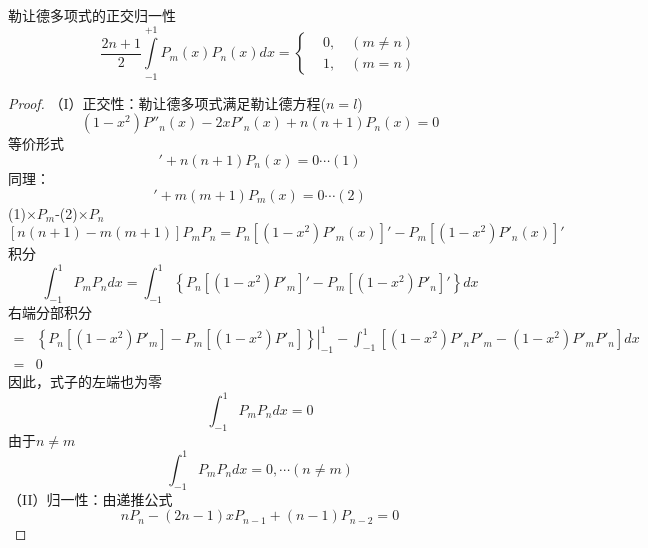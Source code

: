 	\begin{proposition}勒让德多项式的正交归一性
		\[ \frac{2n+1}{2} \int\limits_{-1}^{+1}  P_m(x) P_n(x)dx = \left\{ 
			\begin{aligned}
				& 0, \quad (m\ne n) \\ 
				& 1 , \quad (m= n)
			\end{aligned}\right.\]
		\end{proposition}
	\begin{proof}
		（I）正交性：勒让德多项式满足勒让德方程($n=l$)
		\begin{equation*}
			\left(1-x^{2}\right) P'' _n  (x) -2 x P' _n (x)+n(n+1)P_n(x)=0
		\end{equation*}		
		等价形式
		\begin{equation*}
			[\left(1-x^{2}\right) P' _n  (x)]' +n(n+1)P_n(x)=0    \cdots  (1)
		\end{equation*}		
		同理：
		\begin{equation*}
			[\left(1-x^{2}\right) P' _m  (x)]' + m (m+1)P_m(x)=0    \cdots  (2)
		\end{equation*}		
		(1)$\times P_m$-(2)$\times P_n$
		\[ [n(n+1) -m (m+1)] P_m P_n = P_n[\left(1-x^{2}\right) P' _m  (x)]' - P_m[\left(1-x^{2}\right) P' _n  (x)]' \]
		积分 
		\begin{equation*}
				[n(n+1) -m (m+1)]\int_{-1}^{1} P_mP_n dx =\int_{-1}^{1} \left\{P_n [\left(1-x^{2}\right) P' _m] '-P_m [\left(1-x^{2}\right) P' _n ]'\right\}dx
		\end{equation*}
		右端分部积分
		\begin{equation*}
		\begin{split}
			= &\left.\left\{P_n [\left(1-x^{2}\right) P' _m]-P_m [\left(1-x^{2}\right) P' _n ]\right\} \right| _{-1} ^{1}  
			-\int_{-1}^{1}  [\left(1-x^{2}\right) P' _nP' _m -\left(1-x^{2}\right) P' _mP' _n  ]  dx \\
			=&0
		\end{split}
		\end{equation*}		
		因此，式子的左端也为零
		\begin{equation*}
			[n(n+1) -m (m+1)]\int_{-1}^{1} P_mP_n dx =0
		\end{equation*}	
		由于$ n\ne m  $ 
		\begin{equation*}
			\int_{-1}^{1} P_mP_n dx =0 ,\cdots (n\ne m)
		\end{equation*}
		（II）归一性：由递推公式
		\begin{equation*}
			nP_{n} -(2n-1)x P_{n-1} + (n-1)P_{n-2}  =0
		\end{equation*}		

\end{proof}
